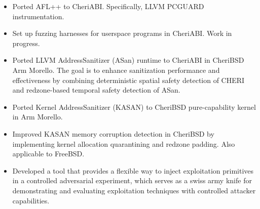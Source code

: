 \documentclass{resume}
\begin{document}
\begin{itemize}
  \item Ported AFL++ to CheriABI. Specifically, LLVM PCGUARD instrumentation.
  \item Set up fuzzing harnesses for userspace programs in CheriABI. Work in progress.
\end{itemize}

\begin{itemize}
  \item Ported LLVM AddressSanitizer (ASan) runtime to CheriABI in CheriBSD Arm Morello. The goal is to enhance sanitization performance and effectiveness by combining deterministic spatial safety detection of CHERI and redzone-based temporal safety detection of ASan.
  \item Ported Kernel AddressSanitizer (KASAN) to CheriBSD pure-capability kernel in Arm Morello. 
  \item Improved KASAN memory corruption detection in CheriBSD by implementing kernel allocation quarantining and redzone padding. Also applicable to FreeBSD.
\end{itemize}


\begin{itemize}
  \item Developed a tool that provides a flexible way to inject exploitation primitives in a controlled adversarial experiment, which serves as a swiss army knife for demonstrating and evaluating exploitation techniques with controlled attacker capabilities.
\end{itemize}
\end{document}
